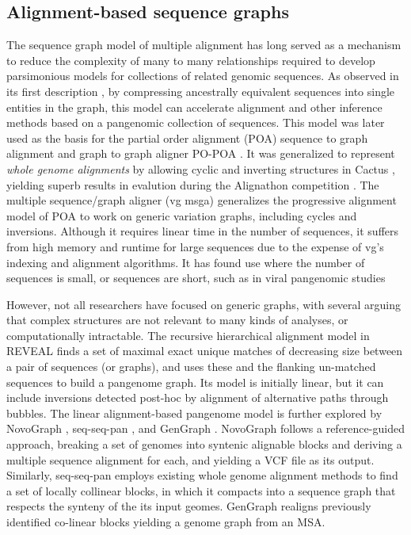 \subsection{Alignment-based sequence graphs}

The sequence graph model of multiple alignment has long served as a mechanism to reduce the complexity of many to many relationships required to develop parsimonious models for collections of related genomic sequences.
As observed in its first description \cite{hein1989new}, by compressing ancestrally equivalent sequences into single entities in the graph, this model can accelerate alignment and other inference methods based on a pangenomic collection of sequences.
This model was later used as the basis for the partial order alignment (POA) sequence to graph alignment and graph to graph aligner PO-POA \cite{Lee_2002,Grasso_2004}.
It was generalized to represent \emph{whole genome alignments} by allowing cyclic and inverting structures in Cactus \cite{Paten_2011}, yielding superb results in evalution during the Alignathon competition \cite{earl2014alignathon}.
The multiple sequence/graph aligner (vg msga) \cite{Novak_2017a,Garrison_2018,Garrison_2019} generalizes the progressive alignment model of POA to work on generic variation graphs, including cycles and inversions.
Although it requires linear time in the number of sequences, it suffers from high memory and runtime for large sequences due to the expense of vg's indexing and alignment algorithms.
It has found use where the number of sequences is small, or sequences are short, such as in viral pangenomic studies \cite{Baaijens2019-ng}

However, not all researchers have focused on generic graphs, with several arguing that complex structures are not relevant to many kinds of analyses, or computationally intractable. %
The recursive hierarchical alignment model in REVEAL \cite{linthorst2015scalable} finds a set of maximal exact unique matches of decreasing size between a pair of sequences (or graphs), and uses these and the flanking un-matched sequences to build a pangenome graph.
Its model is initially linear, but it can include inversions detected post-hoc by alignment of alternative paths through bubbles.
The linear alignment-based pangenome model is further explored by NovoGraph \cite{Biederstedt2018}, seq-seq-pan \cite{Jandrasits_2018}, and GenGraph \cite{Ambler_2019}.
NovoGraph follows a reference-guided approach, breaking a set of genomes into syntenic alignable blocks and deriving a multiple sequence alignment for each, and yielding a VCF file as its output.
Similarly, seq-seq-pan employs existing whole genome alignment methods to find a set of locally collinear blocks, in which it compacts into a sequence graph that respects the synteny of the its input geomes.
GenGraph realigns previously identified co-linear blocks yielding a genome graph from an MSA.

